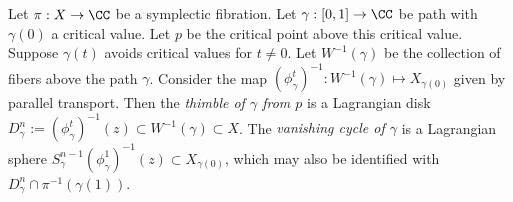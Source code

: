 

    Let $\pi: X\to \CC$ be a symplectic fibration. 
    Let $\gamma:[0, 1]\to \CC$ be path with $\gamma(0)$ a critical value. Let $p$ be the critical point above this critical value. 
    Suppose $\gamma(t)$ avoids critical values for $t\neq 0$. 
    Let $W^{-1}(\gamma)$ be the collection of fibers above the path $\gamma$.
    Consider the map $(\phi_{\gamma}^{t})^{-1}:W^{-1}(\gamma)\mapsto X_{\gamma(0)}$ given by parallel transport.
    Then the \emph{thimble of $\gamma$ from $p$} is a Lagrangian disk $D^n_\gamma:= (\phi_{\gamma}^{t})^{-1}(z)\subset W^{-1}(\gamma)\subset X$.
    The \emph{vanishing cycle of $\gamma$} is a Lagrangian sphere $S^{n-1}_\gamma (\phi_{\gamma}^{1})^{-1}(z)\subset X_{\gamma(0)}$, which may also be identified with $ D^n_\gamma\cap  \pi^{-1}(\gamma(1))$. 

